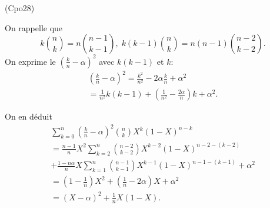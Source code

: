 \begin{tiny}(Cpo28)\end{tiny} On rappelle que
\[
  k\binom{n}{k} = n\binom{n-1}{k-1},\; k(k-1)\binom{n}{k} = n(n-1)\binom{n-2}{k-2}. 
\]
On exprime le $\left(\frac{k}{n}-\alpha\right)^2$ avec $k(k-1)$ et $k$:
\begin{multline*}
\left(\frac{k}{n}-\alpha\right)^2
= \frac{k^2}{n^2} - 2\alpha \frac{k}{n} + \alpha^2 \\
=\frac{1}{n^2}k(k-1) + \left(\frac{1}{n^2} - \frac{2\alpha}{n} \right)k + \alpha^2.
\end{multline*}

On en déduit
\begin{multline*}
\sum_{k=0}^n \left( \frac{k}{n}-\alpha \right)^2\binom{n}{k}X^k(1-X)^{n-k}\\
= \frac{n-1}{n}X^2\sum_{k=2}^n \binom{n-2}{k-2}X^{k-2}(1-X)^{n-2-(k-2)}\\
+ \frac{1-n\alpha}{n} X \sum_{k=1}^n \binom{n-1}{k-1}X^{k-1}(1-X)^{n-1-(k-1)} + \alpha^2 \\
= (1-\frac{1}{n}) X^2 + (\frac{1}{n}-2\alpha) X + \alpha^2 \\
= (X-\alpha)^2 + \frac{1}{n}X(1-X).
\end{multline*}

